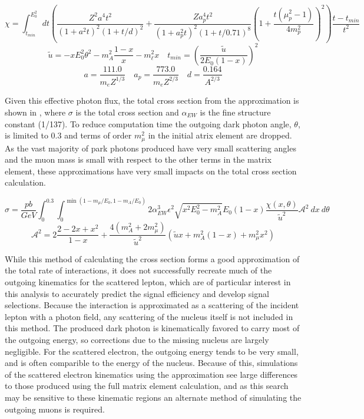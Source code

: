 \begin{equation}
	\label{eq:chi}
	\chi = \int^{E_0^2}_{t_{min}} dt \left( \frac{Z^2a^4t^2}{(1+a^2t)^2(1+t/d)^2}+\frac{Za_p^4t^2}{(1+a_p^2t)^2(1+t/0.71)^8}\left(1+\frac{t(\mu_p^2-1)}{4m_p^2}\right)^2\right)\frac{t-t_{min}}{t^2}
\end{equation}
\begin{equation}
	\label{eq:utilde}
	\tilde{u} = -xE_0^2\theta^2 - m_A^2\frac{1-x}{x} - m_\ell^2x
	\quad
	t_{min} = \left(\frac{\tilde{u}}{2E_0(1-x)}\right)^2
\end{equation}
\begin{equation}
	\label{eq:adefs}
	a = \frac{111.0}{m_e Z^{1/3}}
	\quad
	a_p = \frac{773.0}{m_e Z^{2/3}}
	\quad
	d = \frac{0.164}{A^{2/3}}
\end{equation}

Given this effective photon flux, the total cross section from the \ww approximation is shown in  \cite{Bjorken_2009}, where $\sigma$ is the total cross section and $\alpha_{EW}$ is the fine structure constant (1/137).
To reduce computation time the outgoing dark photon angle, $\theta$, is limited to 0.3 and terms of order $m_\mu^2$ in the initial atrix element are dropped.
As the vast majority of park photons produced have very small scattering angles and the muon mass is small with respect to the other terms in the matrix element, these approximations have very small impacts on the total cross section calculation.

\begin{equation}
	\label{eq:fullCX}
        \sigma = \frac{pb}{GeV} \int_0^{0.3} \int_0^{\min(1-m_\mu/E_0,1-m_A/E_0)} 2 \alpha_{EW}^3\epsilon^2 \sqrt{x^2E_0^2 - m_A^2}E_0(1-x) 
	    \frac{\chi(x,\theta)}{\tilde{u}^2} \mathcal{A}^2
~dx~d\theta
\end{equation}
\begin{equation}
	\label{eq:afunc}
	\mathcal{A}^2 = 2\frac{2-2x+x^2}{1-x}+\frac{4(m_A^2+2m_\mu^2)}{\tilde{u}^2}(\tilde{u}x + m_A^2(1-x) + m_\mu^2x^2)
\end{equation}

While this method of calculating the cross section forms a good approximation of the total rate of \dbrem interactions, it does not successfully recreate much of the outgoing kinematics for the scattered lepton, which are of particular interest in this analysis to accurately predict the signal efficiency and develop signal selections.
Because the interaction is approximated as a scattering of the incident lepton with a photon field, any scattering of the nucleus itself is not included in this method.
The produced dark photon is kinematically favored to carry most of the outgoing energy, so corrections due to the missing nucleus are largely negligible.
For the scattered electron, the outgoing energy tends to be very small, and is often comparible to the energy of the nucleus.
Because of this, simulations of the scattered electron kinematics using the \ww approximation see large differences to those produced using the full matrix element calculation, and as this search may be sensitive to these kinematic regions an alternate method of simulating the outgoing muons is required.

